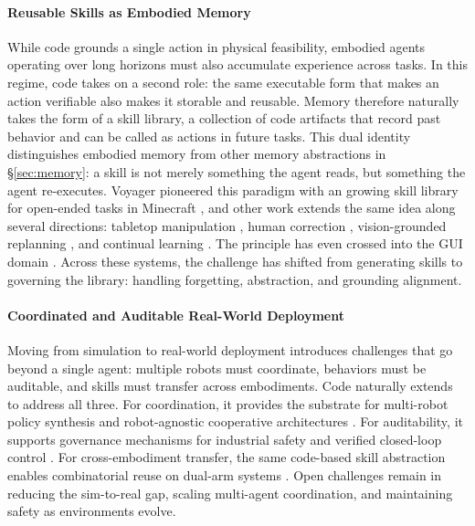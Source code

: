 \documentclass{llmxive}
\begin{document}
\paragraph{Reusable Skills as Embodied Memory} While code grounds a single action in physical feasibility, embodied agents operating over long horizons must also accumulate experience across tasks. In this regime, code takes on a second role: the same executable form that makes an action verifiable also makes it storable and reusable. 
Memory therefore naturally takes the form of a skill library, a collection of code artifacts that record past behavior and can be called as actions in future tasks.
This dual identity distinguishes embodied memory from other memory abstractions in \S\ref{sec:memory}: a skill is not merely something the agent reads, but something the agent re-executes. Voyager pioneered this paradigm with an growing skill library for open-ended tasks in Minecraft \citep{wang2023voyager}, and other work extends the same idea along several directions: tabletop manipulation \citep{tziafas2024lifelong}, human correction \citep{meng2025growing}, vision-grounded replanning \citep{kagaya2025vireskill}, and continual learning \citep{wang2026lifelong}. The principle has even crossed into the GUI domain \citep{lin2026uivoyagerselfevolvingguiagent}. Across these systems, the challenge has shifted from generating skills to governing the library: handling forgetting, abstraction, and grounding alignment.

\paragraph{Coordinated and Auditable Real-World Deployment} Moving from simulation to real-world deployment introduces challenges that go beyond a single agent: multiple robots must coordinate, behaviors must be auditable, and skills must transfer across embodiments. Code naturally extends to address all three. For coordination, it provides the substrate for multi-robot policy synthesis \citep{ji2026genswarm} and robot-agnostic cooperative architectures \citep{ashley2026racas}. For auditability, it supports governance mechanisms for industrial safety \citep{guan2025normcode, liu2026agents4plc} and verified closed-loop control \citep{santos2026alrm}. For cross-embodiment transfer, the same code-based skill abstraction enables combinatorial reuse on dual-arm systems \citep{zhai2026skillvla}. Open challenges remain in reducing the sim-to-real gap, scaling multi-agent coordination, and maintaining safety as environments evolve.
\end{document}
